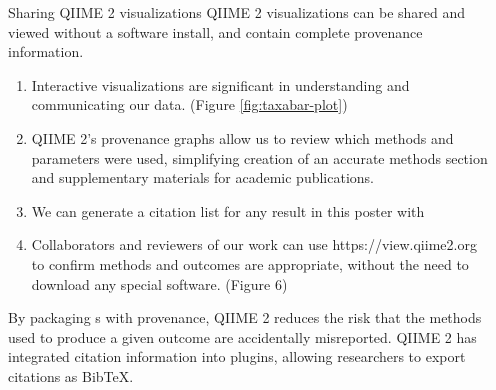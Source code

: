 \documentclass[final]{beamer}
\newlength{\sepwidth}
\newlength{\colwidth}
\newcommand{\separatorcolumn}{\begin{column}{\sepwidth}\end{column}}
\begin{document}
\begin{frame}[t]
\begin{columns}[t]
\separatorcolumn

\begin{column}{\colwidth}

    \begin{block}{Sharing QIIME 2 visualizations}
      QIIME 2 visualizations can be shared and viewed without a software
      install, and contain complete provenance information.

      \begin{enumerate}
        \item Interactive visualizations are significant in understanding and
        communicating our data. (Figure \ref{fig:taxabar-plot})
        \item QIIME 2's provenance graphs allow us to review which methods and
        parameters were used, simplifying creation of an accurate methods section
        and supplementary materials for academic publications.
        \item We can generate a citation list for any result in this poster with 
        \item Collaborators and reviewers of our work can use https://view.qiime2.org to confirm methods and outcomes are
        appropriate, without the need to download any special software. (Figure 6)
      \end{enumerate}

    \begin{tcolorbox}
    [width=\textwidth, colframe=blue]
    {By packaging s with provenance, QIIME 2 reduces the risk that the
    methods used to produce a given outcome are accidentally misreported.
    QIIME 2 has integrated citation information into plugins, allowing
    researchers to export citations as BibTeX}.
    \end{tcolorbox}



\end{block}
\end{column}
\end{columns}
\end{frame}
\end{document}
